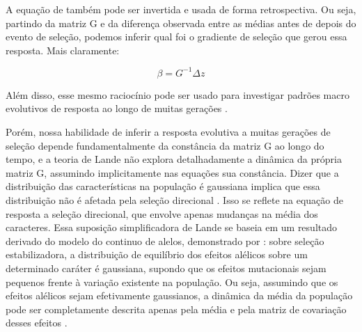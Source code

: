 A equação de \cite{Lande1979} também pode ser invertida e usada de forma
retrospectiva.
Ou seja, partindo da matriz G e da diferença observada entre as médias
antes de depois do evento de seleção, podemos inferir qual foi o
gradiente de seleção que gerou essa resposta.
Mais claramente:

\begin{equation}
    \beta = G^{-1}\Delta z
\end{equation}

Além disso, esse mesmo raciocínio pode ser usado para investigar padrões
macro evolutivos de resposta ao longo de muitas gerações
\citep[veja também a equação \ref{betatotal}]{Lande1983, Marroig2004, Marroig2005}.

Porém, nossa habilidade de inferir a resposta evolutiva a muitas
gerações de seleção depende fundamentalmente da constância da matriz G
ao longo do tempo, e a teoria de Lande não explora
detalhadamente a dinâmica da própria matriz G, assumindo implicitamente
nas equações sua constância.
Dizer que a distribuição das características na população é 
gaussiana implica que essa distribuição não é afetada pela seleção direcional
\citep{Barton1987}.
Isso se reflete na equação de resposta a seleção direcional, que envolve
apenas mudanças na média dos caracteres.
Essa suposição simplificadora de Lande se baseia em um resultado
derivado do modelo do continuo de alelos, demonstrado por
\cite{Kimura1965}: sobre seleção estabilizadora, a
distribuição de equilíbrio dos efeitos alélicos sobre um determinado
caráter é gaussiana, supondo que os efeitos mutacionais sejam pequenos
frente à variação existente na população.
Ou seja, assumindo que os efeitos alélicos sejam efetivamente
gaussianos, a dinâmica da média da população pode ser completamente
descrita apenas pela média e pela matriz de covariação desses efeitos
\citep{Barton1987}.

